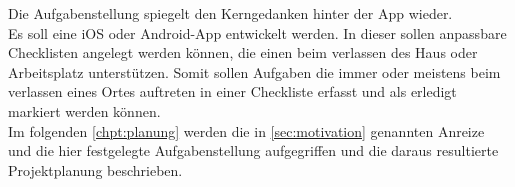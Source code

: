 Die Aufgabenstellung spiegelt den Kerngedanken hinter der App wieder.\\
Es soll eine iOS oder Android-App entwickelt werden.
In dieser sollen anpassbare Checklisten angelegt werden können, die einen beim verlassen des Haus oder Arbeitsplatz unterstützen. Somit sollen Aufgaben die immer oder meistens beim verlassen eines Ortes auftreten in einer Checkliste erfasst und als erledigt markiert werden können.\\
Im folgenden \autoref{chpt:planung}  werden die in \autoref{sec:motivation}  genannten Anreize und die hier festgelegte Aufgabenstellung aufgegriffen und die daraus resultierte Projektplanung beschrieben.